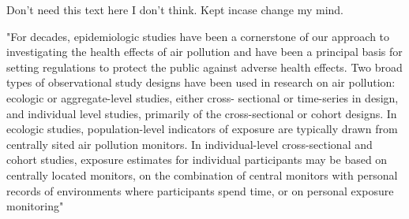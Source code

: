 Don't need this text here I don't think. Kept incase change my mind.

\cite{Zeger2000} "For decades, epidemiologic studies have been a cornerstone of our approach to investigating the health effects of air pollution and have been a principal basis for setting regulations to protect the public against adverse health effects. Two broad types of observational study designs have been used in research on air pollution: ecologic or aggregate-level studies, either cross- sectional or time-series in design, and individual level studies, primarily of the cross-sectional or cohort designs. In ecologic studies, population-level indicators of exposure are typically drawn from centrally sited air pollution monitors. In individual-level cross-sectional and cohort studies, exposure estimates for individual participants may be based on centrally located monitors, on the combination of central monitors with personal records of environments where participants spend time, or on personal exposure monitoring"